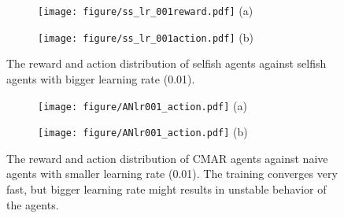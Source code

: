\documentclass{article}
\begin{document}
\begin{figure}
\centering
\begin{subfigure}{.48\textwidth}
\centering
\texttt{[image: figure/ss\_lr\_001reward.pdf]}
(a)
\end{subfigure}
\begin{subfigure}{.48\textwidth}
\centering
\texttt{[image: figure/ss\_lr\_001action.pdf]}
(b)
\end{subfigure}
    \caption{The reward and action distribution of selfish agents against selfish agents with bigger learning rate (0.01).}
\label{fig:misc-SSb}
\end{figure}

\begin{figure}
\centering
\begin{subfigure}{.48\textwidth}
\centering
\texttt{[image: figure/ANlr001\_action.pdf]}
(a)
\end{subfigure}
\begin{subfigure}{.48\textwidth}
\centering
\texttt{[image: figure/ANlr001\_action.pdf]}
(b)
\end{subfigure}
    \caption{The reward and action distribution of CMAR agents against naive agents with smaller learning rate (0.01). The training converges very fast, but bigger learning rate might results in unstable behavior of the agents.}
\label{fig:misc-an}
\end{figure}
\end{document}
